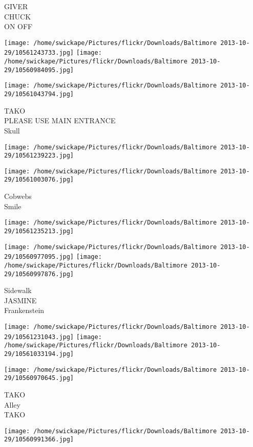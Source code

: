 \documentclass[10pt,letterpaper]{article}
\begin{document}
GIVER\\
CHUCK\\
ON OFF
\pagebreak

\texttt{[image: /home/swickape/Pictures/flickr/Downloads/Baltimore 2013-10-29/10561243733.jpg]}
\texttt{[image: /home/swickape/Pictures/flickr/Downloads/Baltimore 2013-10-29/10560984095.jpg]}

\texttt{[image: /home/swickape/Pictures/flickr/Downloads/Baltimore 2013-10-29/10561043794.jpg]}

TAKO\\
PLEASE USE MAIN ENTRANCE\\
Skull
\pagebreak

\texttt{[image: /home/swickape/Pictures/flickr/Downloads/Baltimore 2013-10-29/10561239223.jpg]}

\vspace{0.25in}
\texttt{[image: /home/swickape/Pictures/flickr/Downloads/Baltimore 2013-10-29/10561003076.jpg]}

Cobwebs\\
Smile
\pagebreak

\texttt{[image: /home/swickape/Pictures/flickr/Downloads/Baltimore 2013-10-29/10561235213.jpg]}

\vspace{0.25in}
\texttt{[image: /home/swickape/Pictures/flickr/Downloads/Baltimore 2013-10-29/10560977095.jpg]}
\texttt{[image: /home/swickape/Pictures/flickr/Downloads/Baltimore 2013-10-29/10560997876.jpg]}

Sidewalk\\
JASMINE\\
Frankenstein
\pagebreak

\texttt{[image: /home/swickape/Pictures/flickr/Downloads/Baltimore 2013-10-29/10561231043.jpg]}
\texttt{[image: /home/swickape/Pictures/flickr/Downloads/Baltimore 2013-10-29/10561033194.jpg]}

\texttt{[image: /home/swickape/Pictures/flickr/Downloads/Baltimore 2013-10-29/10560970645.jpg]}

TAKO\\
Alley\\
TAKO
\pagebreak

\texttt{[image: /home/swickape/Pictures/flickr/Downloads/Baltimore 2013-10-29/10560991366.jpg]}
\end{document}
